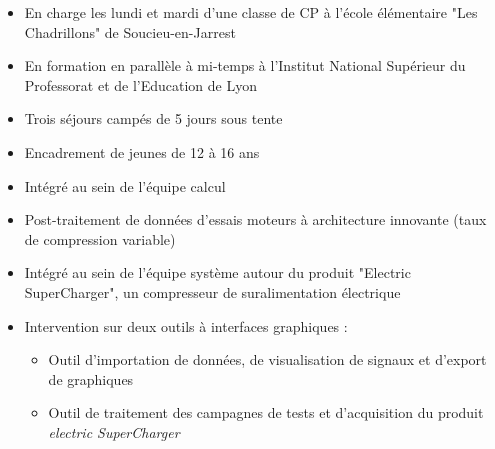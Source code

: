 \documentclass[10pt,a4paper,ragged2e,withhyper,normalphoto]{altacv}
\begin{document}
\begin{paracol}{2}
	
\medskip




\begin{itemize}
	\item En charge les lundi et mardi d'une classe de CP à l'école élémentaire "Les Chadrillons" de Soucieu-en-Jarrest
	\item En formation en parallèle à mi-temps à l'Institut National Supérieur du Professorat et de l'Education de Lyon
\end{itemize}

\divider

\begin{itemize}
	\item Trois séjours campés de 5 jours sous tente
	\item Encadrement de jeunes de 12 à 16 ans
\end{itemize}

\divider

\begin{itemize}
	\item Intégré au sein de l'équipe calcul
	\item Post-traitement de données d'essais moteurs à architecture innovante (taux de compression variable)
\end{itemize}

\divider

\begin{itemize}
	\item Intégré au sein de l'équipe système autour du produit "Electric SuperCharger", un compresseur de suralimentation électrique
	\item Intervention sur deux outils à interfaces graphiques :
	\begin{itemize}
		\item Outil d'importation de données, de visualisation de signaux et d'export de graphiques
		\item Outil de traitement des campagnes de tests et d'acquisition du produit \emph{electric SuperCharger} 
	\end{itemize}
\end{itemize}


\end{paracol}
\end{document}
